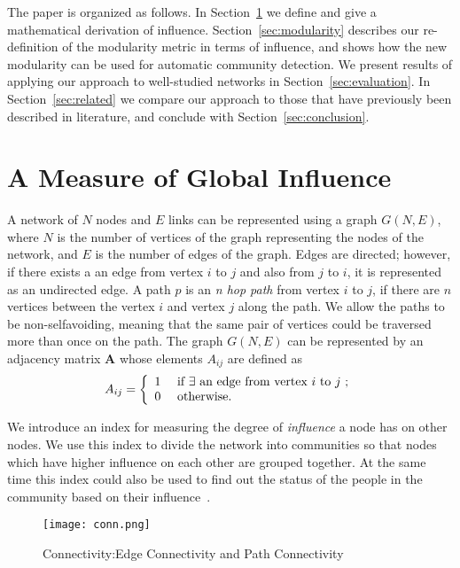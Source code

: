 \documentclass{sig-alternate}
\newcommand{\secref}[1]{Section~\ref{#1}}
\begin{document}
The paper is organized as follows. In \secref{sec:influence} we define and give a mathematical derivation of influence. \secref{sec:modularity} describes our re-definition of the modularity metric in terms of influence, and shows how the new modularity can be used for automatic community detection. We present results of applying our approach to well-studied networks in \secref{sec:evaluation}. In \secref{sec:related} we compare our approach to those that have previously been described in literature, and conclude with \secref{sec:conclusion}.







\section{A Measure of  Global Influence}
\label{sec:influence}
A network  of $N$ nodes and  $E$ links can be represented  using a graph $G(N,E)$, where  $N$ is the number of vertices of the graph representing the nodes of the network, and $E$ is the number of edges of the graph. Edges are directed; however, if there exists a an edge from vertex $i$ to $j$ and also from $j$ to $i$, it is represented as an undirected edge. A path $p$  is an \emph{n  hop path} from  vertex $i$  to $j$,  if there are $n$ vertices between the vertex $i$ and vertex $j$  along the path. We allow the paths to be non-selfavoiding, meaning that the same pair of vertices could be traversed more than once on the path. The graph $G(N,E)$ can be represented by an adjacency matrix $\mathbf{A}$ whose elements $A_{ij}$ are defined as
 \[
A_{ij} = \left \{ \begin {array} {ll}
1 & \mbox{ if  $ \exists$  an edge from vertex $i$ to $j$  } ; \\
0 & \mbox{ otherwise}.
\end{array}
\right. \]



We introduce an index for measuring the degree of \emph{influence} a node has on other nodes. We use this index to divide the network into communities  so that nodes which have higher influence on each other are grouped together. At the same time this index could also be used to find out the status of the people in the community based on their influence~\cite{Katz}.


  \begin{figure}[tbh]
 \texttt{[image: conn.png]}
 \caption{Connectivity:Edge Connectivity and Path Connectivity}
 \label{fig:conn}
 \end{figure}
\end{document}
